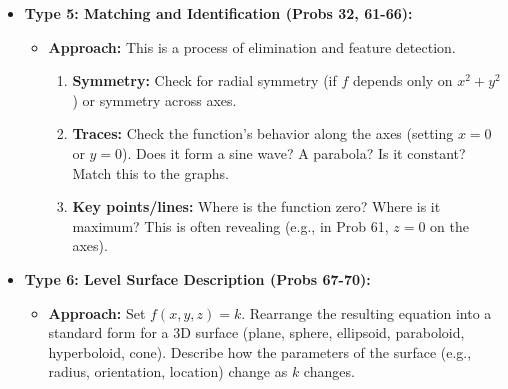 \documentclass{article}
\begin{document}
\begin{itemize}
    \item \textbf{Type 5: Matching and Identification (Probs 32, 61-66):}
    \begin{itemize}
        \item \textbf{Approach:} This is a process of elimination and feature detection.
        \begin{enumerate}
            \item \textbf{Symmetry:} Check for radial symmetry (if $f$ depends only on $x^2+y^2$) or symmetry across axes.
            \item \textbf{Traces:} Check the function's behavior along the axes (setting $x=0$ or $y=0$). Does it form a sine wave? A parabola? Is it constant? Match this to the graphs.
            \item \textbf{Key points/lines:} Where is the function zero? Where is it maximum? This is often revealing (e.g., in Prob 61, $z=0$ on the axes).
        \end{enumerate}
    \end{itemize}
     \item \textbf{Type 6: Level Surface Description (Probs 67-70):}
    \begin{itemize}
        \item \textbf{Approach:} Set $f(x, y, z) = k$. Rearrange the resulting equation into a standard form for a 3D surface (plane, sphere, ellipsoid, paraboloid, hyperboloid, cone). Describe how the parameters of the surface (e.g., radius, orientation, location) change as $k$ changes.
    \end{itemize}
\end{itemize}
\end{document}
